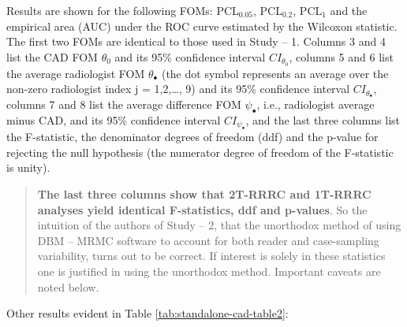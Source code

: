 \documentclass[
]{book}
\begin{document}
Results are shown for the following FOMs: \(\text{PCL}_{0.05}\), \(\text{PCL}_{0.2}\), \(\text{PCL}_{1}\) and the empirical area (AUC) under the ROC curve estimated by the Wilcoxon statistic. The first two FOMs are identical to those used in Study -- 1. Columns 3 and 4 list the CAD FOM \(\theta_0\) and its 95\% confidence interval \(CI_{\theta_0}\), columns 5 and 6 list the average radiologist FOM \(\theta_{\bullet}\) (the dot symbol represents an average over the non-zero radiologist index j = 1,2,\ldots, 9) and its 95\% confidence interval \(CI_{\theta_{\bullet}}\), columns 7 and 8 list the average difference FOM \(\psi_{\bullet}\), i.e., radiologist average minus CAD, and its 95\% confidence interval \(CI_{\psi_{\bullet}}\), and the last three columns list the F-statistic, the denominator degrees of freedom (ddf) and the p-value for rejecting the null hypothesis (the numerator degree of freedom of the F-statistic is unity).

\begin{quote}
\textbf{The last three columns show that 2T-RRRC and 1T-RRRC analyses yield identical F-statistics, ddf and p-values}. So the intuition of the authors of Study -- 2, that the unorthodox method of using DBM -- MRMC software to account for both reader and case-sampling variability, turns out to be correct. If interest is solely in these statistics one is justified in using the unorthodox method. Important caveats are noted below.
\end{quote}

Other results evident in Table \ref{tab:standalone-cad-table2}:
\end{document}
